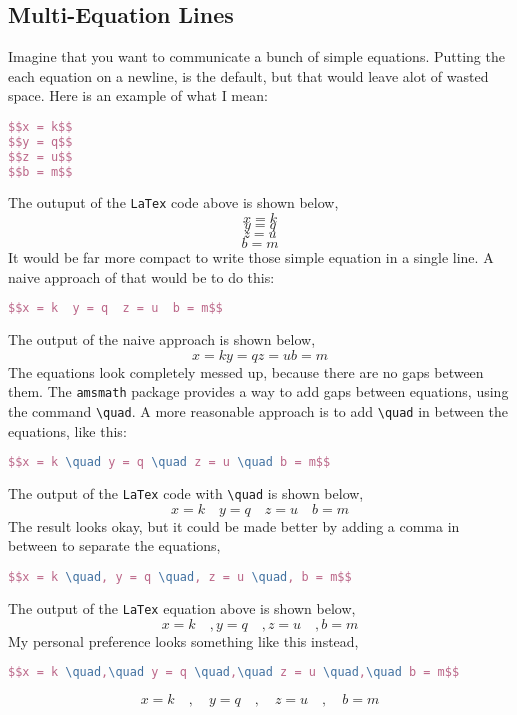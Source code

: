 \documentclass[a4paper, 12pt]{report}
\begin{document}
\begin{center}
\subsection{Multi-Equation Lines} \label{multi-equation line}
\begin{comment}
\end{comment}
Imagine that you want to communicate a bunch of simple equations. Putting the each equation on a newline, is the default, but that would leave alot of wasted space. Here is an example of what I mean:
\begin{lstlisting}[language=tex]
$$x = k$$
$$y = q$$
$$z = u$$
$$b = m$$
\end{lstlisting}
The outuput of the \texttt{LaTex} code above is shown below,
$$x = k$$
$$y = q$$
$$z = u$$
$$b = m$$
It would be far more compact to write those simple equation in a single line. A naive approach of that would be to do this:
\begin{lstlisting}[language=tex]
$$x = k  y = q  z = u  b = m$$
\end{lstlisting}
The output of the naive approach is shown below,
$$x = k  y = q  z = u  b = m$$
The equations look completely messed up, because there are no gaps between them. The \texttt{amsmath} package provides a way to add gaps between equations, using the command \texttt{\textbackslash quad}. A more reasonable approach is to add \texttt{\textbackslash quad} in between the equations, like this:
\begin{lstlisting}[language=tex]
$$x = k \quad y = q \quad z = u \quad b = m$$
\end{lstlisting}
The output of the \texttt{LaTex} code with \texttt{\textbackslash quad} is shown below,
$$x = k \quad y = q \quad z = u \quad b = m$$
The result looks okay, but it could be made better by adding a comma in between to separate the equations,
\begin{lstlisting}[language=tex]
$$x = k \quad, y = q \quad, z = u \quad, b = m$$
\end{lstlisting}
The output of the \texttt{LaTex} equation above is shown below,
$$x = k \quad, y = q \quad, z = u \quad, b = m$$
My personal preference looks something like this instead,
\begin{lstlisting}[language=tex]
$$x = k \quad,\quad y = q \quad,\quad z = u \quad,\quad b = m$$
\end{lstlisting}
$$x = k \quad,\quad y = q \quad,\quad z = u \quad,\quad b = m$$


\end{center}
\end{document}
